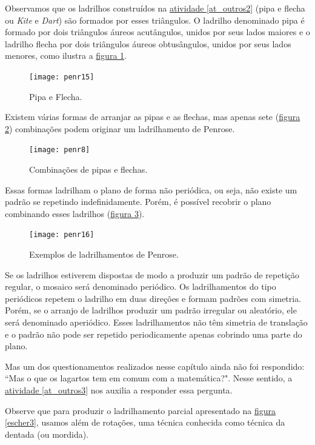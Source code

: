 Observamos que os ladrilhos construídos na \hyperref[at_outros2]{atividade \ref{at_outros2}} (pipa e flecha ou  \textit{Kite} e \textit{Dart}) são formados por esses triângulos. O ladrilho denominado pipa é formado por dois triângulos áureos acutângulos, unidos por seus lados maiores e o ladrilho flecha por dois triângulos áureos obtusângulos, unidos por seus lados menores, como ilustra a \hyperref[penr_15]{figura \ref{penr_15}}. 

 \begin{figure}[H]
	\centering
	\texttt{[image: penr15]}
	\caption{Pipa e Flecha.}
	\label{penr_15}
\end{figure}


Existem várias formas de arranjar as pipas e as flechas, mas apenas sete (\hyperref[penr_8]{figura \ref{penr_8}}) combinações podem originar um ladrilhamento de  Penrose.

 \begin{figure}[H]
	\centering
	\texttt{[image: penr8]}
	\caption{Combinações de pipas e flechas.}
	\label{penr_8}
\end{figure}



Essas formas  ladrilham o plano de forma não periódica, ou seja, não existe um padrão se repetindo indefinidamente. Porém, é possível recobrir o plano combinando esses ladrilhos (\hyperref[penr_16]{figura \ref{penr_16}}). 

 \begin{figure}[H]
	\centering
	\texttt{[image: penr16]}
	\caption{Exemplos de ladrilhamentos de Penrose.}
	\label{penr_16}
\end{figure}

Se os ladrilhos estiverem dispostas de modo a produzir um padrão de repetição regular, o mosaico será denominado periódico. Os ladrilhamentos do tipo periódicos repetem o ladrilho em duas direções e formam padrões com simetria. Porém, se o arranjo de ladrilhos produzir um padrão irregular ou aleatório, ele será denominado aperiódico. Esses ladrilhamentos não têm simetria de translação e o padrão não pode ser repetido periodicamente apenas cobrindo uma parte do plano.

Mas um dos questionamentos realizados nesse capítulo ainda não foi respondido: “Mas o que os lagartos tem em comum com a matemática?". Nesse sentido, a \hyperref[at_outros3]{atividade \ref{at_outros3}} nos auxilia a responder essa pergunta.

Observe que para produzir o ladrilhamento parcial apresentado na \hyperref[escher3]{figura \ref{escher3}}, usamos além de rotações, uma técnica conhecida como técnica da dentada (ou mordida).

